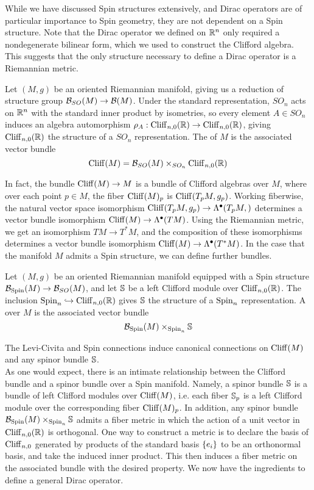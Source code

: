 While we have discussed Spin structures extensively, and Dirac operators are
of particular importance to Spin geometry, they are not dependent on a Spin structure.
Note that the Dirac operator we defined on $\R^n$ only required a nondegenerate
bilinear form, which we used to construct the Clifford algebra. This suggests
that the only structure necessary to define a Dirac operator is a Riemannian metric.
%
\begin{defn}
Let $(M,g)$ be an oriented Riemannian manifold, giving us a reduction of structure
group $\B_{SO}(M) \to \B(M)$. Under the standard representation, $SO_n$ acts on $\R^n$
with the standard inner product by isometries, so every element $A \in SO_n$ induces
an algebra automorphism  $\rho_A : \Cliff_{n,0}(\R) \to \Cliff_{n,0}(\R)$, giving
$\Cliff_{n,0}(\R)$ the structure of a $SO_n$ representation. The 
of $M$ is the associated vector bundle
\[
\Cliff(M) = \B_{SO}(M) \times_{SO_n} \Cliff_{n,0}(\R)
\]
\end{defn}
%
In fact, the bundle $\Cliff(M) \to M$ is a bundle of Clifford algebras over $M$, where
over each point $p \in M$, the fiber $\Cliff(M)_p$ is $\Cliff(T_pM, g_p)$. Working
fiberwise, the natural vector space isomorphism
$\Cliff(T_pM, g_p) \to \Lambda^\bullet(T_pM,)$ determines  a vector bundle isomorphism
$\Cliff(M) \to \Lambda^\bullet(TM)$. Using the Riemannian metric, we get an isomorphism
$TM \to T^*M$, and the composition of these isomorphisms determines a vector bundle
isomorphism $\Cliff(M) \to \Lambda^\bullet(T^*M)$. In the case that the manifold
$M$ admits a Spin structure, we can define further bundles.
%
\begin{defn}
Let $(M,g)$ be an oriented Riemannian manifold equipped with a Spin structure
$\B_{\Spin}(M) \to \B_{SO}(M)$, and let $\S$ be a left Clifford module over
$\Cliff_{n,0}(\R)$. The inclusion $\Spin_n \hookrightarrow \Cliff_{n,0}(\R)$ gives $\S$
the structure of a $\Spin_n$ representation. A  over $M$ is the
associated vector bundle
\[
\B_\Spin(M) \times_{\Spin_n} \S
\]
\end{defn}
%
The Levi-Civita and Spin connections induce canonical connections on $\Cliff(M)$ and
any spinor bundle $\S$. \\
%

As one would expect, there is an intimate relationship between the Clifford bundle
and a spinor bundle over a Spin manifold. Namely, a spinor bundle $\S$ is a
bundle of left Clifford modules over $\Cliff(M)$, i.e. each fiber $\S_p$ is a left
Clifford module over the corresponding fiber $\Cliff(M)_p$.
In addition, any spinor bundle $\B_{\Spin}(M) \times_{\Spin_n}\S$ admits a fiber metric
in which the action of a unit vector in $\Cliff_{n,0}(\R)$ is orthogonal. One way
to construct a metric is to declare the basis of $\Cliff_{n,0}$ generated by products
of the standard basis $\set{e_i}$ to be an orthonormal basis, and take the induced
inner product. This then induces a fiber metric on
the associated bundle with the desired property. We now have the ingredients to define
a general Dirac operator. \\
%

